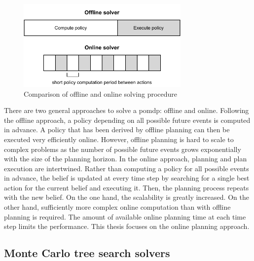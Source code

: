 \begin{figure}[htbp]
    \centering
    \includegraphics[width=0.75\textwidth]{figures/online-offline.pdf}
    \caption{Comparison of offline and online solving procedure}
\end{figure}



There are two general approaches to solve a \gls{pomdp}: offline and online. Following the offline approach, a policy depending on all possible future events is computed in advance. A policy that has been derived by offline planning can then be executed very efficiently online. However, offline planning is hard to scale to complex problems as the number of possible future events grows exponentially with the size of the planning horizon. In the online approach, planning and plan execution are intertwined. Rather than computing a policy for all possible events in advance, the belief is updated at every time step by searching for a single best action for the current belief and executing it. Then, the planning process repeats with the new belief. On the one hand, the scalability is greatly increased. On the other hand, sufficiently more complex online computation than with offline planning is required. The amount of available online planning time at each time step limits the performance. This thesis focuses on the online planning approach.

\subsection{Monte Carlo tree search solvers}


